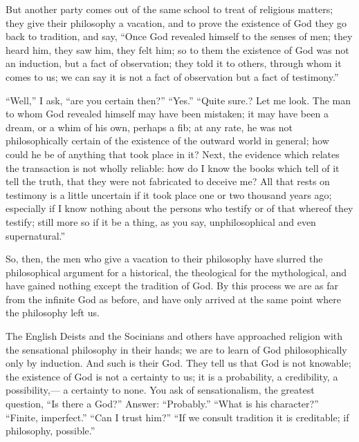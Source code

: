 \documentclass[12pt]{article}
\begin{document}
But another party comes out of the same school to treat of religious matters; they give their philosophy a vacation, and to prove the existence of God they go back to tradition, and say, ``Once God revealed himself to the senses of men; they heard him, they saw him, they felt him; so to them the existence of God was not an induction, but a fact of observation; they told it to others, through whom it comes to us; we can say it is not a fact of observation but a fact of testimony.'' 

``Well,'' I ask, ``are you certain then?'' ``Yes.'' ``Quite sure.? Let me look. The man to whom God revealed himself may have been mistaken; it may have been a dream, or a whim of his own, perhaps a fib; at any rate, he was not philosophically certain of the existence of the outward world in general; how could he be of anything that took place in it? Next, the evidence which relates the transaction is not wholly reliable: how do I know the books which tell of it tell the truth, that they were not fabricated to deceive me? All that rests on testimony is a little uncertain if it took place one or two thousand years ago; especially if I know nothing about the persons who testify or of that whereof they testify; still more so if it be a thing, as you say, unphilosophical and even supernatural.'' 

So, then, the men who give a vacation to their philosophy have slurred the philosophical argument for a historical, the theological for the mythological, and have gained nothing except the tradition of God. By this process we are as far from the infinite God as before, and have only arrived at the same point where the philosophy left us. 

The English Deists and the Socinians and others have approached religion with the sensational philosophy in their hands; we are to learn of God philosophically only by induction. And such is their God. They tell us that God is not knowable; the existence of God is not a certainty to us; it is a probability, a credibility, a possibility,--- a certainty to none. You ask of sensationalism, the greatest question, ``Is there a God?'' Answer: ``Probably.'' ``What is his character?'' ``Finite, imperfect.'' ``Can I trust him?'' ``If we consult tradition it is creditable; if philosophy, possible.'' 
\end{document}
